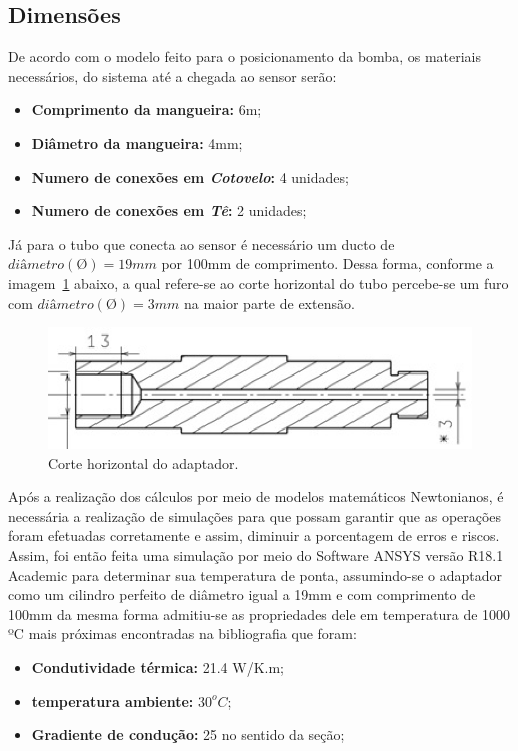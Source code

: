 \subsection{Dimensões}
De acordo com o modelo feito para o posicionamento da bomba, os materiais necessários, do sistema até a chegada ao sensor serão: 
\begin{itemize}
	\item \textbf{Comprimento da mangueira:} 6m;
	\item \textbf{Diâmetro da mangueira:} 4mm;
	\item \textbf{Numero de conexões em \emph{Cotovelo}:} 4 unidades;
	\item \textbf{Numero de conexões em \emph{Tê}:} 2 unidades;
\end{itemize}
Já para o tubo que conecta ao sensor é necessário um ducto de $diâmetro(Ø) =19mm$ por 100mm de comprimento. Dessa forma, conforme a imagem~\ref{fig7tc} abaixo, a qual refere-se ao corte horizontal do tubo percebe-se um furo com $diâmetro(Ø) =3mm$ na maior parte de extensão.
\begin{figure}[!htb]                  
	\centering                          
	\includegraphics[scale=1]{figuras/Figura7tc.eps}
	\caption{Corte horizontal  do adaptador.} \label{fig7tc}              
\end{figure}
\newpage
Após a realização dos cálculos por meio de modelos matemáticos Newtonianos, é necessária a realização de simulações para que possam garantir que as operações foram efetuadas corretamente e assim, diminuir a porcentagem de erros e riscos.
Assim, foi então feita uma simulação por meio do Software ANSYS versão R18.1 Academic para determinar sua temperatura de ponta, assumindo-se o adaptador como um cilindro perfeito de diâmetro igual a 19mm e com comprimento de 100mm da mesma forma admitiu-se as propriedades dele em temperatura de 1000 ºC mais próximas encontradas na bibliografia que foram:
\begin{itemize}
	\item \textbf{Condutividade térmica:} 21.4 W/K.m;
	\item \textbf{temperatura ambiente:} $30^oC$;
	\item \textbf{Gradiente de condução:} 25 no sentido da seção;
\end{itemize}
